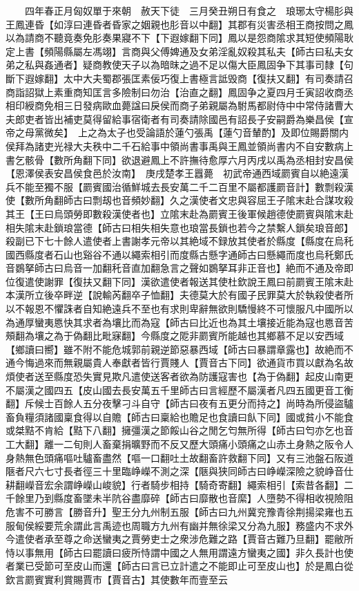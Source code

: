 　　四年春正月匈奴單于來朝　赦天下徒　三月癸丑朔日有食之　琅琊太守楊肜與王鳳連昏【如淳曰連昏者昏家之姻親也肜音以中翻】其郡有災害丞相王商按問之鳳以為請商不聽竟奏免肜奏果寢不下【下遐嫁翻下同】鳳以是怨商隂求其短使頻陽耿定上書【頻陽縣屬左馮翊】言商與父傅婢通及女弟淫亂奴殺其私夫【師古曰私夫女弟之私與姦通者】疑商教使天子以為暗昩之過不足以傷大臣鳳固争下其事司隸【句斷下遐嫁翻】太中大夫蜀郡張匡素佞巧復上書極言詆毁商【復扶又翻】有司奏請召商詣詔獄上素重商知匡言多險制曰勿治【治直之翻】鳳固争之夏四月壬寅詔收商丞相印綬商免相三日發病歐血薨諡曰戾侯而商子弟親屬為駙馬都尉侍中中常侍諸曹大夫郎吏者皆出補吏莫得留給事宿衛者有司奏請除國邑有詔長子安嗣爵為樂昌侯【宣帝之母黨微矣】　上之為太子也受論語於蓮勺張禹【蓮勺音輦酌】及即位賜爵關内侯拜為諸吏光禄大夫秩中二千石給事中領尚書事禹與王鳳並領尚書内不自安數病上書乞骸骨【數所角翻下同】欲退避鳳上不許撫待愈厚六月丙戌以禹為丞相封安昌侯【恩澤侯表安昌侯食邑於汝南】　庚戌楚孝王囂薨　初武帝通西域罽賓自以絶遠漢兵不能至獨不服【罽賓國治循鮮城去長安萬二千二百里不屬都護罽音計】數剽殺漢使【數所角翻師古曰剽刼也音頻妙翻】久之漢使者文忠與容屈王子隂末赴合謀攻殺其王【王曰烏頭勞即數殺漢使者也】立隂末赴為罽賓王後軍候趙德使罽賓與隂末赴相失隂末赴鎖琅當德【師古曰相失相失意也琅當長鎖也若今之禁繫人鎖矣琅音郎】殺副已下七十餘人遣使者上書謝孝元帝以其絶域不録放其使者於縣度【縣度在烏秅國西縣度者石山也谿谷不通以繩索相引而度縣古懸字通師古曰懸繩而度也烏秅鄭氏音鷃拏師古曰烏音一加翻秅音直加翻急言之聲如鷃拏耳非正音也】絶而不通及帝即位復遣使謝罪【復扶又翻下同】漢欲遣使者報送其使杜欽說王鳳曰前罽賓王隂末赴本漢所立後卒畔逆【說輸芮翻卒子恤翻】夫德莫大於有國子民罪莫大於執殺使者所以不報恩不懼誅者自知絶遠兵不至也有求則卑辭無欲則驕慢終不可懷服凡中國所以為通厚蠻夷㥦快其求者為壤比而為寇【師古曰比近也為其土壤接近能為寇也㥦音苦頰翻為壤之為于偽翻比毗寐翻】今縣度之阸非罽賓所能越也其鄉慕不足以安西域【鄉讀曰嚮】雖不附不能危城郭前親逆節惡暴西域【師古曰暴謂章露也】故絶而不通今悔過來而無親屬貴人奉獻者皆行賈賤人【賈音古下同】欲通貨市買以獻為名故煩使者送至縣度恐失實見欺凡遣使送客者欲為防護寇害也【為于偽翻】起皮山南更不屬漢之國四五【皮山國去長安萬五千里師古曰言經歷不屬漢者凡四五國更音工衡翻】斥候士百餘人五分夜擊刁斗自守【師古曰夜有五更分而持之】尚時為所侵盜驢畜負糧須諸國稟食得以自贍【師古曰稟給也贍足也食讀曰飤下同】國或貧小不能食或桀黠不肯給【黠下八翻】擁彊漢之節餒山谷之閒乞匄無所得【師古曰匄亦乞也音工大翻】離一二旬則人畜棄捐曠野而不反又歷大頭痛小頭痛之山赤土身熱之阪令人身熱無色頭痛嘔吐驢畜盡然【嘔一口翻吐土故翻畜許救翻下同】又有三池盤石阪道陿者尺六七寸長者徑三十里臨峥嶸不測之深【陿與狭同師古曰峥嶸深險之貌峥音仕耕翻嶸音宏余謂峥嶸山峻貌】行者騎步相持【騎奇寄翻】繩索相引【索昔各翻】二千餘里乃到縣度畜墜未半阬谷盡靡碎【師古曰靡散也音縻】人墮勢不得相收視險阻危害不可勝言【勝音升】聖王分九州制五服【師古曰九州冀兖豫青徐荆揚梁雍也五服甸侯綏要荒余謂此言禹迹也周職方九州有幽并無徐梁又分為九服】務盛内不求外今遣使者承至尊之命送蠻夷之賈勞吏士之衆涉危難之路【賈音古難乃旦翻】罷敝所恃以事無用【師古曰罷讀曰疲所恃謂中國之人無用謂遠方蠻夷之國】非久長計也使者業已受節可至皮山而還【師古曰言已立計遣之不能即止可至皮山也】於是鳳白從欽言罽賓實利賞賜賈市【賈音古】其使數年而壹至云

